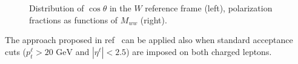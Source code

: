 \begin{figure}[!tb]
\centering
{}
\qquad
{}
\caption{Distribution of $\cos\theta$ in the $W$ reference frame (left), polarization fractions as functions of 
$M_{ww}$ (right).}
\label{fig:distrib_thetal_polfrac_lepcut}
\end{figure} 

The approach proposed in ref~\cite{Ballestrero:2017bxn} can be applied also when
standard acceptance cuts ($p_t^{\ell}>20 \,\,\mathrm{GeV}$ and
 $|\eta^{\ell}| < 2.5$) are imposed on both charged leptons.

